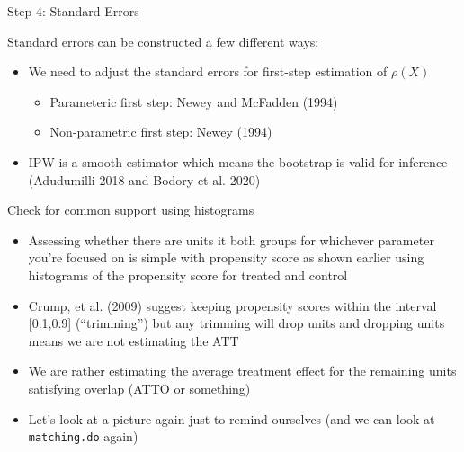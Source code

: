 \documentclass{beamer}
\begin{document}
\begin{frame}{Step 4: Standard Errors}
	
		
Standard errors can be constructed a few different ways:
	\begin{itemize}
	\item We need to adjust the standard errors for first-step estimation of $\rho(X)$
		\begin{itemize}
		\item Parameteric first step: Newey and McFadden (1994)
		\item Non-parametric first step: Newey (1994)
		\end{itemize}
	\item IPW is a smooth estimator which means the bootstrap is valid for inference  (Adudumilli 2018 and Bodory et al. 2020) 
	\end{itemize}
\end{frame}


\begin{frame}{Check for common support using histograms}

\begin{itemize}

\item Assessing whether there are units it both groups for whichever parameter you're focused on is simple with propensity score as shown earlier using histograms of the propensity score for treated and control
\item Crump, et al. (2009) suggest keeping propensity scores within the interval [0.1,0.9] (``trimming'') but any trimming will drop units and dropping units means we are not estimating the ATT
\item We are rather estimating the average treatment effect for the remaining units satisfying overlap (ATTO or something)
\item Let's look at a picture again just to remind ourselves (and we can look at \texttt{matching.do} again)

\end{itemize}

\end{frame}
\end{document}
